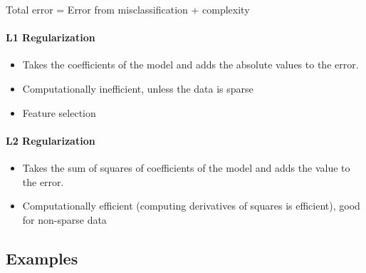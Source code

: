 \documentclass[11pt]{article}
\providecommand{\tightlist}{%
      \setlength{\itemsep}{0pt}\setlength{\parskip}{0pt}}
\begin{document}
Total error = Error from misclassification + complexity

\hypertarget{l1-regularization}{%
\paragraph{L1 Regularization}\label{l1-regularization}}

\begin{itemize}
\tightlist
\item
  Takes the coefficients of the model and adds the absolute values to
  the error.
\item
  Computationally inefficient, unless the data is sparse
\item
  Feature selection
\end{itemize}

\hypertarget{l2-regularization}{%
\paragraph{L2 Regularization}\label{l2-regularization}}

\begin{itemize}
\tightlist
\item
  Takes the sum of squares of coefficients of the model and adds the
  value to the error.
\item
  Computationally efficient (computing derivatives of squares is
  efficient), good for non-sparse data
\end{itemize}

    \hypertarget{examples}{%
\subsection{Examples}\label{examples}}
\end{document}
